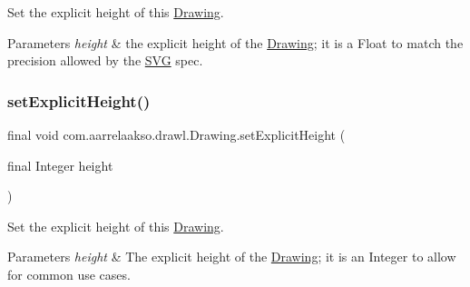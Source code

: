 Set the explicit height of this \hyperlink{classcom_1_1aarrelaakso_1_1drawl_1_1_drawing}{Drawing}. 


\begin{DoxyParams}{Parameters}
{\em height} & the explicit height of the \hyperlink{classcom_1_1aarrelaakso_1_1drawl_1_1_drawing}{Drawing}; it is a Float to match the precision allowed by the \hyperlink{classcom_1_1aarrelaakso_1_1drawl_1_1_s_v_g}{S\+VG} spec. \\
\hline
\end{DoxyParams}
\mbox{\label{classcom_1_1aarrelaakso_1_1drawl_1_1_drawing_a58214bce0e8aa1f15a88f6daaf0e85c6}} 
\subsubsection{\texorpdfstring{set\+Explicit\+Height()}{setExplicitHeight()}\hspace{0.1cm}{\footnotesize\ttfamily [3/3]}}
{\footnotesize\ttfamily final void com.\+aarrelaakso.\+drawl.\+Drawing.\+set\+Explicit\+Height (\begin{DoxyParamCaption}\item[{final Integer}]{height }\end{DoxyParamCaption})}



Set the explicit height of this \hyperlink{classcom_1_1aarrelaakso_1_1drawl_1_1_drawing}{Drawing}. 


\begin{DoxyParams}{Parameters}
{\em height} & The explicit height of the \hyperlink{classcom_1_1aarrelaakso_1_1drawl_1_1_drawing}{Drawing}; it is an Integer to allow for common use cases. \\
\hline
\end{DoxyParams}
\mbox{\label{classcom_1_1aarrelaakso_1_1drawl_1_1_drawing_a54f9447ef03b883cac2bf4535e777a7a}} 
